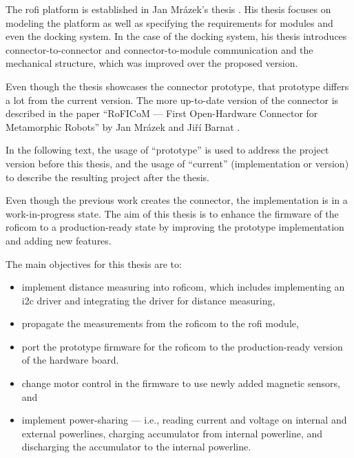 \documentclass[
  digital,     %
  oneside,     %
  nosansbold,  %
  nocolorbold, %
  nolof,         %
  nolot,         %
]{fithesis4}
\begin{document}
The \acrshort{rofi} platform is established in Jan Mrázek's thesis \cite{Mrazek2019thesis}. His
thesis focuses on modeling the platform as well as specifying the requirements for modules and even
the docking system. In the case of the docking system, his thesis introduces connector-to-connector
and connector-to-module communication and the mechanical structure, which was improved over the
proposed version.

Even though the thesis showcases the connector prototype, that prototype differs a lot from the
current version. The more up-to-date version of the connector is described in the paper ``RoFICoM
--- First Open-Hardware Connector for Metamorphic Robots'' by Jan Mrázek and Jiří Barnat
\cite{MrazekBarnat2019Roficom}.

In the following text, the usage of ``prototype'' is used to address the project version before this
thesis, and the usage of ``current'' (implementation or version) to describe the resulting project
after the thesis.

Even though the previous work creates the connector, the implementation is in a work-in-progress
state. The aim of this thesis is to enhance the firmware of the \acrshort{roficom} to a
production-ready state by improving the prototype implementation and adding new features.

The main objectives for this thesis are to:
\begin{itemize}
    \item implement distance measuring into \acrshort{roficom}, which includes implementing an
    \acrshort{i2c} driver and integrating the driver for distance measuring, \item propagate the
    measurements from the \acrshort{roficom} to the \acrshort{rofi} module, \item port the prototype
        firmware for the \acrshort{roficom} to the production-ready version of the hardware board.
    \item change motor control in the firmware to use newly added magnetic sensors, and \item
        implement power-sharing --- i.e., reading current and voltage on internal and external
        powerlines, charging accumulator from internal powerline, and discharging the accumulator to
        the internal powerline.
\end{itemize}
\end{document}
